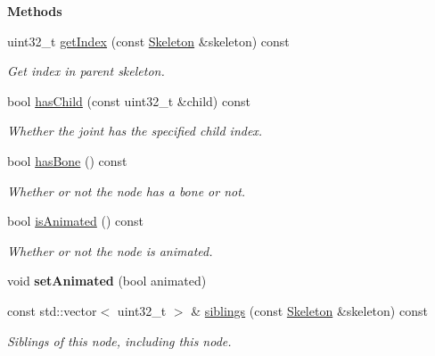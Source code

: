 \begin{Indent}\textbf{ Methods}\par
\begin{DoxyCompactItemize}
\item 
\mbox{\label{classrev_1_1_skeleton_joint_ad916f2dbbbaabfc0f99c1f5fba25fcf3}} 
uint32\+\_\+t \mbox{\hyperlink{classrev_1_1_skeleton_joint_ad916f2dbbbaabfc0f99c1f5fba25fcf3}{get\+Index}} (const \mbox{\hyperlink{classrev_1_1_skeleton}{Skeleton}} \&skeleton) const
\begin{DoxyCompactList}\small\item\em Get index in parent skeleton. \end{DoxyCompactList}\item 
\mbox{\label{classrev_1_1_skeleton_joint_ad0c20bc1495e8baa40a767a5b5fecf96}} 
bool \mbox{\hyperlink{classrev_1_1_skeleton_joint_ad0c20bc1495e8baa40a767a5b5fecf96}{has\+Child}} (const uint32\+\_\+t \&child) const
\begin{DoxyCompactList}\small\item\em Whether the joint has the specified child index. \end{DoxyCompactList}\item 
\mbox{\label{classrev_1_1_skeleton_joint_a82a29ae0fa5a5cf59450368d7ce8e154}} 
bool \mbox{\hyperlink{classrev_1_1_skeleton_joint_a82a29ae0fa5a5cf59450368d7ce8e154}{has\+Bone}} () const
\begin{DoxyCompactList}\small\item\em Whether or not the node has a bone or not. \end{DoxyCompactList}\item 
\mbox{\label{classrev_1_1_skeleton_joint_ad3493ae55491ba2ebbe53cef96aa2be5}} 
bool \mbox{\hyperlink{classrev_1_1_skeleton_joint_ad3493ae55491ba2ebbe53cef96aa2be5}{is\+Animated}} () const
\begin{DoxyCompactList}\small\item\em Whether or not the node is animated. \end{DoxyCompactList}\item 
\mbox{\label{classrev_1_1_skeleton_joint_a1d2597d28b3d5bf8b94916b93206ce41}} 
void {\bfseries set\+Animated} (bool animated)
\item 
\mbox{\label{classrev_1_1_skeleton_joint_aedcbf9d3e112be4c21d6b9d8bbab4007}} 
const std\+::vector$<$ uint32\+\_\+t $>$ \& \mbox{\hyperlink{classrev_1_1_skeleton_joint_aedcbf9d3e112be4c21d6b9d8bbab4007}{siblings}} (const \mbox{\hyperlink{classrev_1_1_skeleton}{Skeleton}} \&skeleton) const
\begin{DoxyCompactList}\small\item\em Siblings of this node, including this node. \end{DoxyCompactList}\end{DoxyCompactItemize}
\end{Indent}
